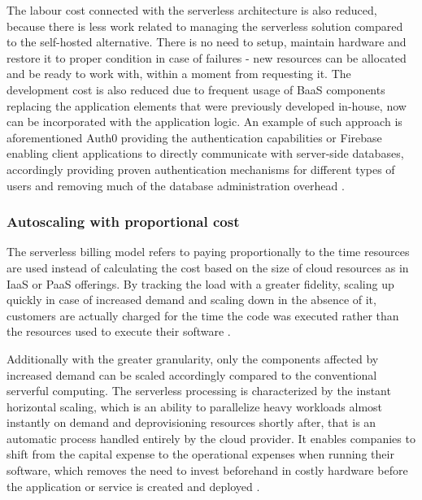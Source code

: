 The labour cost connected with the serverless architecture is also reduced, because there is less work related to managing the serverless solution compared to the self-hosted alternative. There is no need to setup, maintain hardware and restore it to proper condition in case of failures - new resources can be allocated and be ready to work with, within a moment from requesting it. The development cost is also reduced due to frequent usage of BaaS components replacing the application elements that were previously developed in-house, now can be incorporated with the application logic. An example of such approach is aforementioned Auth0 providing the authentication capabilities or Firebase enabling client applications to directly communicate with server-side databases, accordingly providing proven authentication mechanisms for different types of users and removing much of the database administration overhead \cite{MartinFowlerServerless}.

\subsubsection*{Autoscaling with proportional cost}

The serverless billing model refers to paying proportionally to the time resources are used instead of calculating the cost based on the size of cloud resources as in IaaS or PaaS offerings. By tracking the load with a greater fidelity, scaling up quickly in case of increased demand and scaling down in the absence of it, customers are actually charged for the time the code was executed rather than the resources used to execute their software \cite{BerkeleyServerless}.

Additionally with the greater granularity, only the components affected by increased demand can be scaled accordingly compared to the conventional serverful computing. The serverless processing is characterized by the instant horizontal scaling, which is an ability to parallelize heavy workloads almost instantly on demand and deprovisioning resources shortly after, that is an automatic process handled entirely by the cloud provider. It enables companies to shift from the capital expense to the operational expenses when running their software, which removes the need to invest beforehand in costly hardware before the application or service is created and deployed \cite{LeveragingServerlessCloudComputingArchitectures}.

